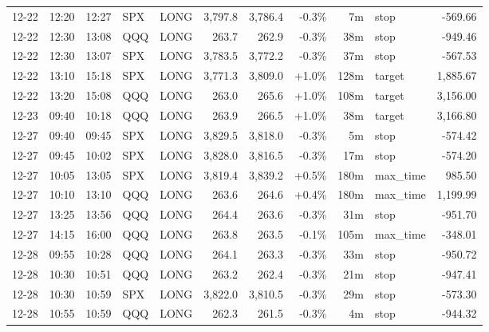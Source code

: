 \documentclass[11pt,a4paper,twoside]{article}
\begin{document}
\begin{center}
\begin{longtable}{>{\color{txtmain}}l l l l l r r r r >{\color{txtmain}}l r}
12-22 & 12:20 & 12:27 & SPX & LONG & 3,797.8 & 3,786.4 & \textcolor{lossred}{-0.3\%} & 7m & stop & \textcolor{lossred}{-569.66} \\
12-22 & 12:30 & 13:08 & QQQ & LONG & 263.7 & 262.9 & \textcolor{lossred}{-0.3\%} & 38m & stop & \textcolor{lossred}{-949.46} \\
12-22 & 12:30 & 13:07 & SPX & LONG & 3,783.5 & 3,772.2 & \textcolor{lossred}{-0.3\%} & 37m & stop & \textcolor{lossred}{-567.53} \\
12-22 & 13:10 & 15:18 & SPX & LONG & 3,771.3 & 3,809.0 & \textcolor{wingreen}{+1.0\%} & 128m & target & \textcolor{wingreen}{1,885.67} \\
12-22 & 13:20 & 15:08 & QQQ & LONG & 263.0 & 265.6 & \textcolor{wingreen}{+1.0\%} & 108m & target & \textcolor{wingreen}{3,156.00} \\
12-23 & 09:40 & 10:18 & QQQ & LONG & 263.9 & 266.5 & \textcolor{wingreen}{+1.0\%} & 38m & target & \textcolor{wingreen}{3,166.80} \\
12-27 & 09:40 & 09:45 & SPX & LONG & 3,829.5 & 3,818.0 & \textcolor{lossred}{-0.3\%} & 5m & stop & \textcolor{lossred}{-574.42} \\
12-27 & 09:45 & 10:02 & SPX & LONG & 3,828.0 & 3,816.5 & \textcolor{lossred}{-0.3\%} & 17m & stop & \textcolor{lossred}{-574.20} \\
12-27 & 10:05 & 13:05 & SPX & LONG & 3,819.4 & 3,839.2 & \textcolor{wingreen}{+0.5\%} & 180m & max\_time & \textcolor{wingreen}{985.50} \\
12-27 & 10:10 & 13:10 & QQQ & LONG & 263.6 & 264.6 & \textcolor{wingreen}{+0.4\%} & 180m & max\_time & \textcolor{wingreen}{1,199.99} \\
12-27 & 13:25 & 13:56 & QQQ & LONG & 264.4 & 263.6 & \textcolor{lossred}{-0.3\%} & 31m & stop & \textcolor{lossred}{-951.70} \\
12-27 & 14:15 & 16:00 & QQQ & LONG & 263.8 & 263.5 & \textcolor{lossred}{-0.1\%} & 105m & max\_time & \textcolor{lossred}{-348.01} \\
12-28 & 09:55 & 10:28 & QQQ & LONG & 264.1 & 263.3 & \textcolor{lossred}{-0.3\%} & 33m & stop & \textcolor{lossred}{-950.72} \\
12-28 & 10:30 & 10:51 & QQQ & LONG & 263.2 & 262.4 & \textcolor{lossred}{-0.3\%} & 21m & stop & \textcolor{lossred}{-947.41} \\
12-28 & 10:30 & 10:59 & SPX & LONG & 3,822.0 & 3,810.5 & \textcolor{lossred}{-0.3\%} & 29m & stop & \textcolor{lossred}{-573.30} \\
12-28 & 10:55 & 10:59 & QQQ & LONG & 262.3 & 261.5 & \textcolor{lossred}{-0.3\%} & 4m & stop & \textcolor{lossred}{-944.32} \\

\end{longtable}
\end{center}
\end{document}
